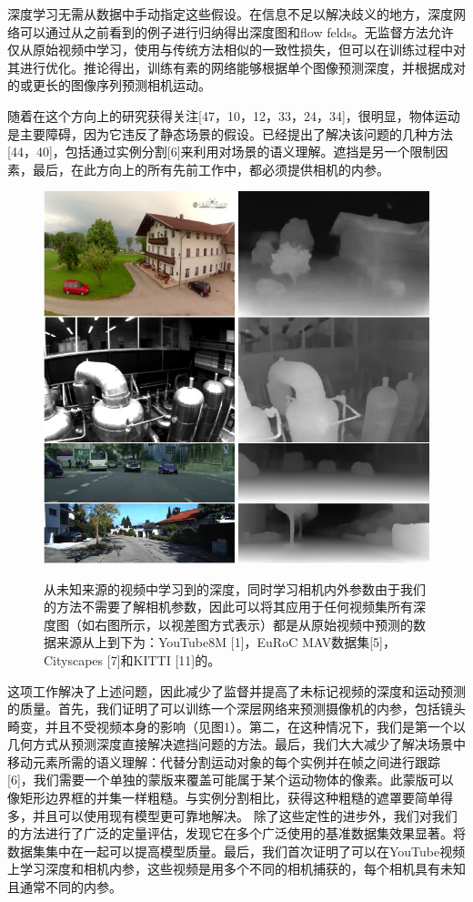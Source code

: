 \documentclass[10pt,journal,compsoc,UTF8]{IEEEtran}
\begin{document}
深度学习无需从数据中手动指定这些假设。在信息不足以解决歧义的地方，深度网络可以通过从之前看到的例子进行归纳得出深度图和flow felds。无监督方法允许仅从原始视频中学习，使用与传统方法相似的一致性损失，但可以在训练过程中对其进行优化。推论得出，训练有素的网络能够根据单个图像预测深度，并根据成对的或更长的图像序列预测相机运动。

随着在这个方向上的研究获得关注[47，10，12，33，24，34]，很明显，物体运动是主要障碍，因为它违反了静态场景的假设。已经提出了解决该问题的几种方法[44，40]，包括通过实例分割[6]来利用对场景的语义理解。遮挡是另一个限制因素，最后，在此方向上的所有先前工作中，都必须提供相机的内参。
\begin{figure}[htbp]
  \begin{framed}
      \centering
    \includegraphics[width=1\linewidth]{imgs/1.png}\\
  \caption{从未知来源的视频中学习到的深度，同时学习相机内外参数由于我们的方法不需要了解相机参数，因此可以将其应用于任何视频集所有深度图（如右图所示，以视差图方式表示）都是从原始视频中预测的数据来源从上到下为：YouTube8M [1]，EuRoC MAV数据集[5]，Cityscapes [7]和KITTI [11]的。}
  \end{framed}
\end{figure}

这项工作解决了上述问题，因此减少了监督并提高了未标记视频的深度和运动预测的质量。首先，我们证明了可以训练一个深层网络来预测摄像机的内参，包括镜头畸变，并且不受视频本身的影响（见图1）。第二，在这种情况下，我们是第一个以几何方式从预测深度直接解决遮挡问题的方法。最后，我们大大减少了解决场景中移动元素所需的语义理解：代替分割运动对象的每个实例并在帧之间进行跟踪[6]，我们需要一个单独的蒙版来覆盖可能属于某个运动物体的像素。此蒙版可以像矩形边界框的并集一样粗糙。与实例分割相比，获得这种粗糙的遮罩要简单得多，并且可以使用现有模型更可靠地解决。
除了这些定性的进步外，我们对我们的方法进行了广泛的定量评估，发现它在多个广泛使用的基准数据集效果显著。将数据集集中在一起可以提高模型质量。最后，我们首次证明了可以在YouTube视频上学习深度和相机内参，这些视频是用多个不同的相机捕获的，每个相机具有未知且通常不同的内参。
\end{document}
